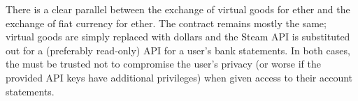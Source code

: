 There is a clear parallel between the exchange of virtual goods for ether and the exchange of fiat currency for ether.  The contract remains mostly the same; virtual goods are simply replaced with dollars and the Steam API is substituted out for a (preferably read-only) API for a user's bank statements.  In both cases, the \encname must be trusted not to compromise the user's privacy (or worse if the provided API keys have additional privileges) when given access to their account statements.



